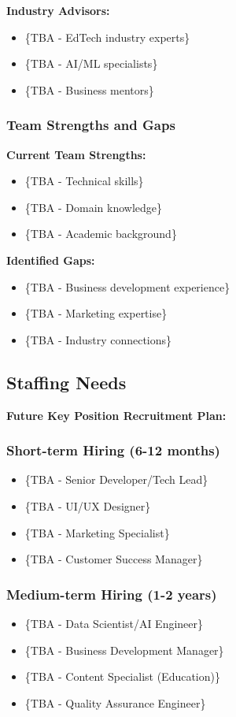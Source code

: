 \textbf{Industry Advisors:}
\begin{itemize}
    \item \{TBA - EdTech industry experts\}
    \item \{TBA - AI/ML specialists\}
    \item \{TBA - Business mentors\}
\end{itemize}

\subsubsection{Team Strengths and Gaps}
\textbf{Current Team Strengths:}
\begin{itemize}
    \item \{TBA - Technical skills\}
    \item \{TBA - Domain knowledge\}
    \item \{TBA - Academic background\}
\end{itemize}

\textbf{Identified Gaps:}
\begin{itemize}
    \item \{TBA - Business development experience\}
    \item \{TBA - Marketing expertise\}
    \item \{TBA - Industry connections\}
\end{itemize}

\subsection{Staffing Needs}
\textbf{Future Key Position Recruitment Plan:}

\subsubsection{Short-term Hiring (6-12 months)}
\begin{itemize}
    \item \{TBA - Senior Developer/Tech Lead\}
    \item \{TBA - UI/UX Designer\}
    \item \{TBA - Marketing Specialist\}
    \item \{TBA - Customer Success Manager\}
\end{itemize}

\subsubsection{Medium-term Hiring (1-2 years)}
\begin{itemize}
    \item \{TBA - Data Scientist/AI Engineer\}
    \item \{TBA - Business Development Manager\}
    \item \{TBA - Content Specialist (Education)\}
    \item \{TBA - Quality Assurance Engineer\}
\end{itemize}

